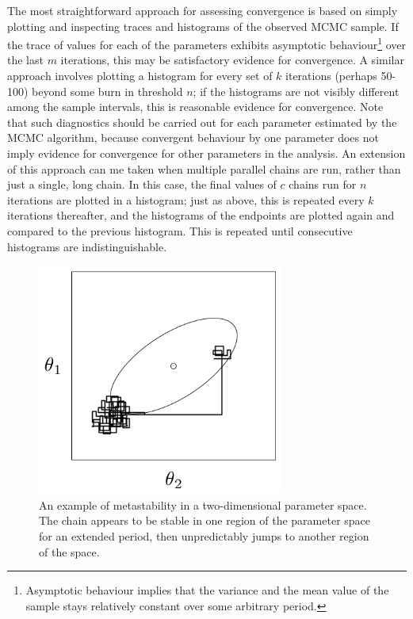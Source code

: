 \documentclass[]{book}
\begin{document}
The most straightforward approach for assessing convergence is based on simply plotting and inspecting traces and histograms of the observed MCMC sample. If the trace of values for each of the parameters exhibits asymptotic behaviour\footnote{Asymptotic behaviour implies that the variance and the mean value of the sample stays relatively constant over some arbitrary period.} over the last $m$ iterations, this may be satisfactory evidence for convergence. A similar approach involves plotting a histogram for every set of $k$ iterations (perhaps 50-100) beyond some burn in threshold $n$; if the histograms are not visibly different among the sample intervals, this is reasonable evidence for convergence. Note that such diagnostics should be carried out for each parameter estimated by the MCMC algorithm, because convergent behaviour by one parameter does not imply evidence for convergence for other parameters in the analysis. An extension of this approach can me taken when multiple parallel chains are run, rather than just a single, long chain. In this case, the final values of $c$ chains run for $n$ iterations are plotted in a histogram; just as above, this is repeated every $k$ iterations thereafter, and the histograms of the endpoints are plotted again and compared to the previous histogram. This is repeated until consecutive histograms are indistinguishable.

\begin{figure}[h]
\begin{center}
\includegraphics[height=3in]{metastable.png}
\caption{An example of metastability in a two-dimensional parameter space. The chain appears to be stable in one region of the parameter space for an extended period, then unpredictably jumps to another region of the space.}
\label{fig:metas}
\end{center}
\end{figure}
\end{document}
